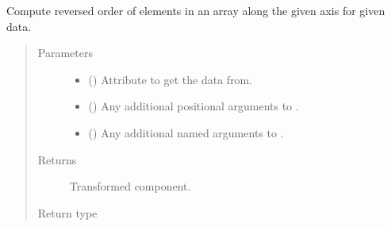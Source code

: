 \documentclass[letterpaper,10pt,english]{sphinxmanual}
\begin{document}
\begin{fulllineitems}
\begin{fulllineitems}
\label{\detokenize{api/base_classes:geology.src.base_spatial.SpatialComponent.flip}}
Compute reversed order of elements in an array along the given axis for given data.
\begin{quote}\begin{description}
\item[{Parameters}] \leavevmode\begin{itemize}
\item {} 
 (\sphinxstyleliteralemphasis{\sphinxupquote{, }}) \textendash{} Attribute to get the data from.

\item {} 
 () \textendash{} Any additional positional arguments to .

\item {} 
 () \textendash{} Any additional named arguments to .

\end{itemize}

\item[{Returns}] \leavevmode
{} \textendash{} Transformed component.

\item[{Return type}] \leavevmode
{\hyperref[\detokenize{api/base_classes:geology.src.base_spatial.SpatialComponent}]{}}

\end{description}\end{quote}

\end{fulllineitems}



\end{fulllineitems}
\end{document}
